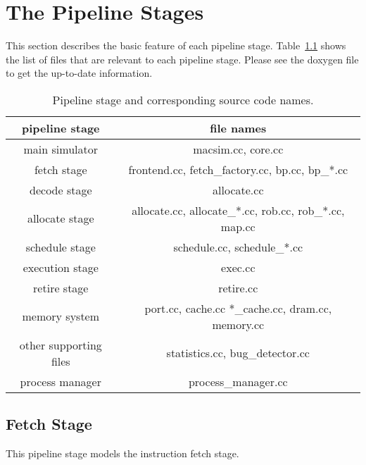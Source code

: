 


\chapter{The Pipeline Stages}

This section describes the basic feature of each pipeline stage. 
Table~\ref{table:pipeline} shows the list of files that are relevant to each pipeline stage. 
Please see the doxygen file to get the up-to-date information. 


\begin{table}[htb]
\begin{center}
\caption{Pipeline stage and corresponding source code names.}
\label{table:pipeline}
\begin{tabular}{|c||c|}
\hline 
pipeline stage         & file names                                             \\ \hline \hline 
main simulator         & macsim.cc, core.cc                                     \\ \hline 
fetch stage            & frontend.cc, fetch\_factory.cc, bp.cc, bp\_*.cc        \\ \hline 
decode stage           & allocate.cc                                            \\ \hline 
allocate stage         & allocate.cc, allocate\_*.cc, rob.cc, rob\_*.cc, map.cc \\ \hline 
schedule stage         & schedule.cc, schedule\_*.cc                            \\ \hline 
execution stage        & exec.cc                                                \\ \hline 
retire stage           & retire.cc                                              \\ \hline 
memory system          & port.cc, cache.cc *\_cache.cc, dram.cc, memory.cc      \\ \hline \hline
other supporting files & statistics.cc, bug\_detector.cc                        \\ \hline \hline 
process manager        & process\_manager.cc                                    \\ \hline 
\end{tabular}
\end{center}
\end{table}



\section{Fetch Stage}
This pipeline stage models the instruction fetch stage. 

